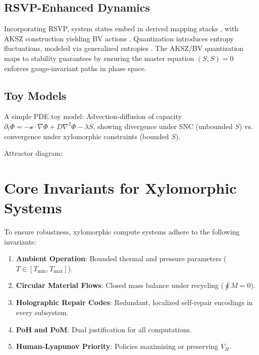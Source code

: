 \documentclass[12pt]{article}
\begin{document}
\subsection{RSVP-Enhanced Dynamics}

Incorporating RSVP, system states embed in derived mapping stacks \citep{ToenVezzosi2008}, with AKSZ construction yielding BV actions \citep{AlexandrovKontsevichSchwarzZaboronsky1997,BatalinVilkovisky1981}. Quantization introduces entropy fluctuations, modeled via generalized entropies \citep{Tsallis1988}. The AKSZ/BV quantization maps to stability guarantees by ensuring the master equation $(S,S)=0$ enforces gauge-invariant paths in phase space.

\subsection{Toy Models}

A simple PDE toy model: Advection-diffusion of capacity \(\partial_t \Phi = -\mathcal{v} \cdot \nabla \Phi + D \nabla^2 \Phi - \lambda S\), showing divergence under SNC (unbounded \(S\)) vs. convergence under xylomorphic constraints (bounded \(S\)).

Attractor diagram:


\section{Core Invariants for Xylomorphic Systems}

To ensure robustness, xylomorphic compute systems adhere to the following invariants:

\begin{enumerate}
\item \textbf{Ambient Operation}: Bounded thermal and pressure parameters (\( T \in [T_{\min}, T_{\max}] \)).
\item \textbf{Circular Material Flows}: Closed mass balance under recycling (\( \oint M = 0 \)).
\item \textbf{Holographic Repair Codes}: Redundant, localized self-repair encodings in every subsystem.
\item \textbf{PoH and PoM}: Dual justification for all computations.
\item \textbf{Human-Lyapunov Priority}: Policies maximizing or preserving \( V_H \).
\end{enumerate}
\end{document}
